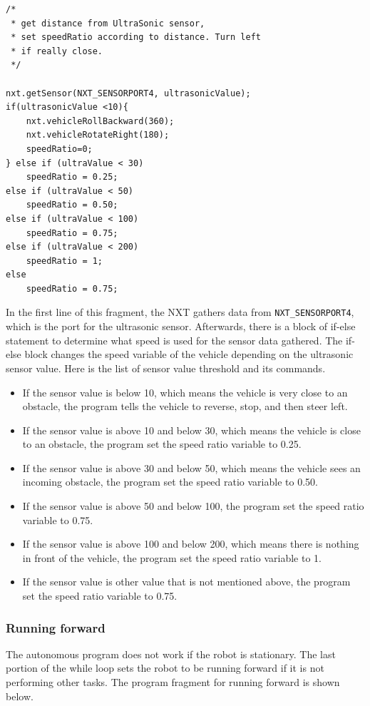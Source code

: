 \documentclass[11pt]{article}
\begin{document}
\begin{verbatim}
/* 
 * get distance from UltraSonic sensor, 
 * set speedRatio according to distance. Turn left 
 * if really close.
 */
       
nxt.getSensor(NXT_SENSORPORT4, ultrasonicValue);
if(ultrasonicValue <10){
    nxt.vehicleRollBackward(360);
    nxt.vehicleRotateRight(180);
    speedRatio=0;
} else if (ultraValue < 30)	
    speedRatio = 0.25;
else if (ultraValue < 50)
    speedRatio = 0.50;
else if (ultraValue < 100)	
    speedRatio = 0.75;
else if (ultraValue < 200)
    speedRatio = 1;
else
    speedRatio = 0.75;
\end{verbatim}

In the first line of this fragment, the NXT gathers data from \verb+NXT_SENSORPORT4+, which is the port for the ultrasonic sensor.
Afterwards, there is a block of if-else statement to determine what speed is used for the sensor data gathered.
The if-else block changes the speed variable of the vehicle depending on the ultrasonic sensor value.
Here is the list of sensor value threshold and its commands.
\begin{itemize}
\item If the sensor value is below 10, which means the vehicle is very close to an obstacle, the program tells the
    vehicle to reverse, stop, and then steer left.
\item If the sensor value is above 10 and below 30, which means the vehicle is close to an obstacle, the
    program set the speed ratio variable to 0.25.
\item If the sensor value is above 30 and below 50, which means the vehicle sees an incoming obstacle, the
    program set the speed ratio variable to 0.50.
\item If the sensor value is above 50 and below 100, the program set the speed ratio variable to 0.75.
\item If the sensor value is above 100 and below 200, which means there is nothing in front of the vehicle,
    the program set the speed ratio variable to 1.
\item If the sensor value is other value that is not mentioned above, the program set the speed ratio variable to 0.75.
\end{itemize}


\subsubsection*{Running forward}
The autonomous program does not work if the robot is stationary.
The last portion of the while loop sets the robot to be running forward if it is not performing other tasks.
The program fragment for running forward is shown below.
\end{document}
